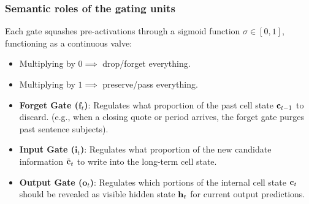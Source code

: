 \documentclass[../../main.tex]{subfiles}
\begin{document}
\subsubsection{Semantic roles of the gating units}
Each gate squashes pre-activations through a sigmoid function $\sigma \in [0, 1]$, functioning as a continuous valve:
\begin{itemize}
    \item Multiplying by $0 \implies$ drop/forget everything.
    \item Multiplying by $1 \implies$ preserve/pass everything.
\end{itemize}
\begin{itemize}
    \item \textbf{Forget Gate ($\mathbf{f}_t$)}: Regulates what proportion of the past cell state $\mathbf{c}_{t-1}$ to discard. (e.g., when a closing quote or period arrives, the forget gate purges past sentence subjects).
    \item \textbf{Input Gate ($\mathbf{i}_t$)}: Regulates what proportion of the new candidate information $\tilde{\mathbf{c}}_t$ to write into the long-term cell state.
    \item \textbf{Output Gate ($\mathbf{o}_t$)}: Regulates which portions of the internal cell state $\mathbf{c}_t$ should be revealed as visible hidden state $\mathbf{h}_t$ for current output predictions.
\end{itemize}
\end{document}
